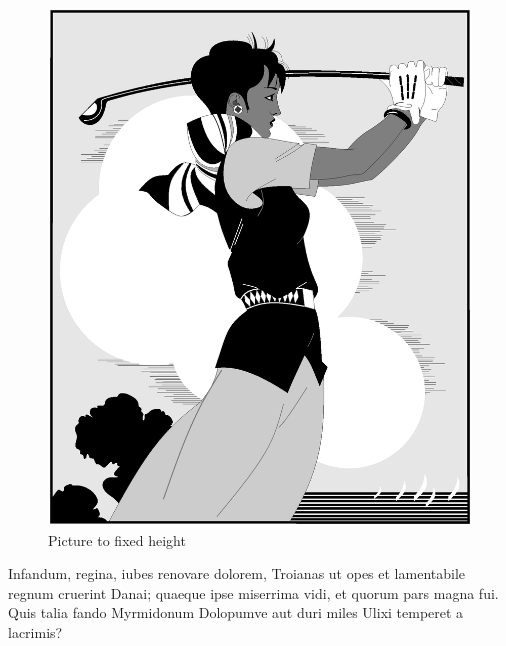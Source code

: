 \documentclass[
    ,final            %
  ]
  {aipproc}
\begin{document}
\begin{figure}
  \includegraphics[height=.3\textheight]{golfer}
  \caption{Picture to fixed height}
\end{figure}

Infandum, regina, iubes renovare dolorem, Troianas ut opes et
lamentabile regnum cruerint Danai; quaeque ipse miserrima vidi, et
quorum pars magna fui. Quis talia fando Myrmidonum Dolopumve aut duri
miles Ulixi temperet a lacrimis?
\end{document}
